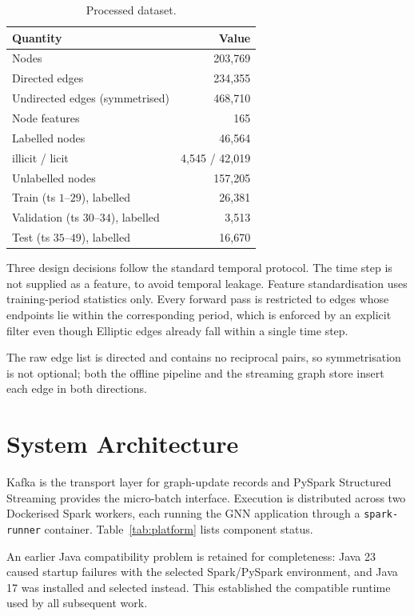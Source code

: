 \documentclass[conference]{IEEEtran}
\begin{document}
\begin{table}[t]
\centering
\caption{Processed dataset.}
\label{tab:data}
\small
\begin{tabular}{@{}lr@{}}
\toprule
Quantity & Value \\
\midrule
Nodes & 203{,}769 \\
Directed edges & 234{,}355 \\
Undirected edges (symmetrised) & 468{,}710 \\
Node features & 165 \\
Labelled nodes & 46{,}564 \\
\quad illicit / licit & 4{,}545 / 42{,}019 \\
Unlabelled nodes & 157{,}205 \\
\midrule
Train (ts $1$--$29$), labelled & 26{,}381 \\
Validation (ts $30$--$34$), labelled & 3{,}513 \\
Test (ts $35$--$49$), labelled & 16{,}670 \\
\bottomrule
\end{tabular}
\end{table}

Three design decisions follow the standard temporal protocol. The time step is
not supplied as a feature, to avoid temporal leakage. Feature standardisation
uses training-period statistics only. Every forward pass is restricted to edges
whose endpoints lie within the corresponding period, which is enforced by an
explicit filter even though Elliptic edges already fall within a single time
step.

The raw edge list is directed and contains no reciprocal pairs, so
symmetrisation is not optional; both the offline pipeline and the streaming
graph store insert each edge in both directions.

\section{System Architecture}

Kafka is the transport layer for graph-update records and PySpark Structured
Streaming provides the micro-batch interface. Execution is distributed across
two Dockerised Spark workers, each running the GNN application through a
\texttt{spark-runner} container. Table~\ref{tab:platform} lists component
status.

An earlier Java compatibility problem is retained for completeness: Java 23
caused startup failures with the selected Spark/PySpark environment, and
Java 17 was installed and selected instead. This established the compatible
runtime used by all subsequent work.
\end{document}
